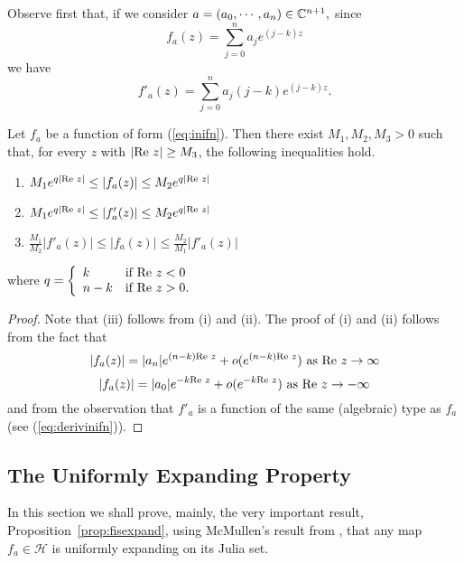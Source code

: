 Observe first that, if we consider $a=(a_0, \cdots, a_n)\in {\mathbb C}^{n+1},$
since
\begin{equation}
  \label{eq:inifn}
  f_a(z)=\sum_{j=0}^{n}a_je^{(j-k)z}
\end{equation}
we have
\begin{equation}
  \label{eq:derivinifn}
  f'_a(z)=\sum_{j=0}^n a_j(j-k) e^{(j-k)z}.
\end{equation}

\begin{lemma}\label{lem:M123}
  Let $f_a$ be a function of form (\ref{eq:inifn}).  Then there exist $M_1,
  M_2, M_3>0$ such that, for every $z$ with $|\textrm{Re } z|\geq M_3$, the following
  inequalities hold.
  \begin{enumerate}
  \item $M_1e^{q|\textrm{Re } z|}\leq |f_a(z)|\leq M_2e^{q|\textrm{Re } z|}$
  \item $M_1e^{q|\textrm{Re } z|}\leq |f'_a(z)|\leq M_2e^{q|\textrm{Re } z|}$
  \item $\frac{M_1}{M_2}|f'_a(z)|\leq |f_a(z)|\leq \frac{
      M_2}{M_1}|f'_a(z)|$
  \end{enumerate}
  where $q=\left\{ \begin{array}{ll} k & \textrm{if } \textrm{Re } z< 0\\ n-k &
      \textrm{if } \textrm{Re } z>0. \end{array}\right.$
\end{lemma} 

\begin{proof}
  Note that (iii) follows from (i) and (ii). The proof of (i) and (ii)
  follows from the fact that
  \[
  |f_a(z)|=|a_n|e^{(n-k)\textrm{Re } z} +o(e^{(n-k)\textrm{Re } z}) \textrm{ as } \textrm{Re }
  z \rightarrow\infty
  \]
  \[
  |f_a(z)|=|a_0|e^{-k\textrm{Re } z}+o(e^{-k\textrm{Re } z})\textrm{ as } \textrm{Re }
  z\rightarrow-\infty
  \]
  and from the observation that $f'_a$ is a function of the same (algebraic)
  type as $f_a$ (see (\ref{eq:derivinifn})).
\end{proof}

\subsection{The Uniformly Expanding Property}

In this section we shall prove, mainly, the very important result,
Proposition~\ref{prop:fisexpand}, using McMullen's result from
\cite{mcmullen:area}, that any map $f_a\in \mathcal{H}$ is uniformly
expanding on its Julia set.


